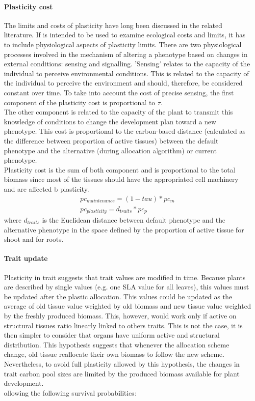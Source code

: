 \paragraph{Plasticity cost}
The limits and costs of plasticity have long been discussed in the related literature. If \model is intended to be used to examine ecological costs and limits, it has to include physiological aspects of plasticity limits. There are two physiological processes involved in the mechanism of altering a phenotype based on changes in external conditions: sensing and signalling. 'Sensing' relates to the capacity of the individual to perceive environmental conditions. This is related to the capacity of the individual to perceive the environment and should, therefore, be considered constant over time. To take into account the cost of precise sensing, the first component of the plasticity cost is proportional to $\tau$.\\
The other component is related to the capacity of the plant to transmit this knowledge of conditions to change the development plan toward a new phenotype. This cost is proportional to the carbon-based distance (calculated as the difference between proportion of active tissues) between the default phenotype and the alternative (during allocation algorithm) or current phenotype.\\
Plasticity cost is the sum of both component and is proportional to the total biomass since most of the tissues should have the appropriated cell machinery and are affected b plasticity.
\begin{align}
pc_{maintenance} = (1 - tau) * pc_m \\
pc_{plasticity} = d_{traits} * pc_p
\end{align}
where $d_{traits}$ is the Euclidean distance between default phenotype and the alternative phenotype in the space defined by the proportion of active tissue for shoot and for roots.

\paragraph{Trait update}
Plasticity in trait suggests that trait values are modified in time. Because plants are described by single values (e.g. one SLA value for all leaves), this values must be updated after the plastic allocation. This values could be updated as the average of old tissue value weighted by old biomass and new tissue value weighted by the freshly produced biomass. This, however, would work only if active on structural tissues ratio linearly linked to others traits. This is not the case, it is then simpler to consider that organs have uniform active and structural distribution. This hypothesis suggests that whenever the allocation scheme change, old tissue reallocate their own biomass to follow the new scheme. Nevertheless, to avoid full plasticity allowed by this hypothesis, the changes in trait carbon pool sizes are limited by the produced biomass available for plant development.\\ollowing the following survival probabilities:


